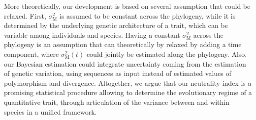 \documentclass{article}
\newcommand{\RateMut}{\sigma^2_{\mathrm{M}}}
\begin{document}
More theoretically, our development is based on several assumption that could be relaxed.
First, $\RateMut$ is assumed to be constant across the phylogeny, while it is determined by the underlying genetic architecture of a trait, which can be variable among individuals and species.
Having a constant $\RateMut$ across the phylogeny is an assumption that can theoretically by relaxed by adding a time component\cite{arnold_understanding_2008, hohenlohe_mipod_2008}, where $\RateMut(t)$ could jointly be estimated along the phylogeny\cite{kostikova_bridging_2016, gaboriau_multiplatform_2020}.
Also, our Bayesian estimation could integrate uncertainty coming from the estimation of genetic variation, using sequences as input instead of estimated values of polymorphism and divergence.
Altogether, we argue that our neutrality index is a promising statistical procedure allowing to determine the evolutionary regime of a quantitative trait, through articulation of the variance between and within species in a unified framework.
\end{document}
